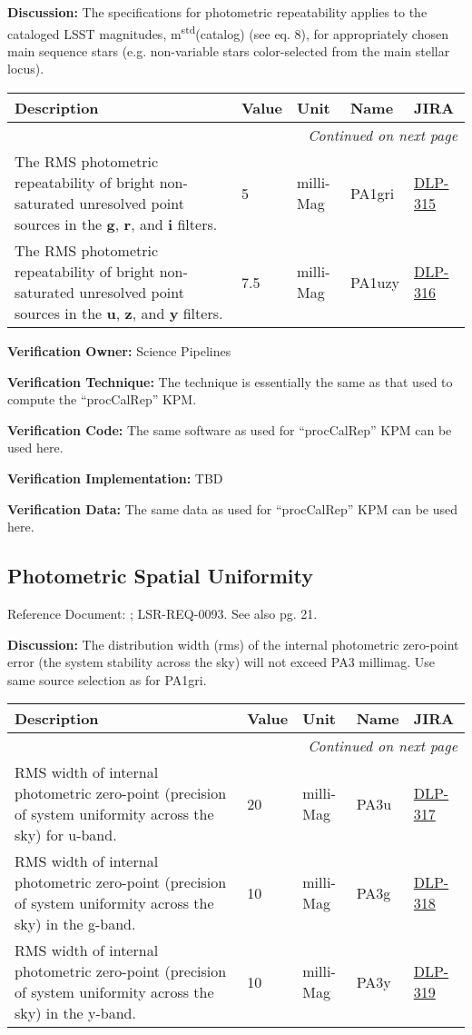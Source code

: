 \documentclass[DM,lsstdraft,toc]{lsstdoc}
\makeatletter
\newcommand{\jira}[1]{\href{https://jira.lsstcorp.org/browse/#1}{#1}}
\newenvironment{metric}[0]{%
\setlength\LTleft{0pt}
\setlength\LTright{\fill}
\begin{longtable}[]{@{}p{0.4\textwidth}lp{0.75in}p{1.3in}p{0.75in}@{}}

\hline \textbf{Description} & \textbf{Value} & \textbf{Unit} & \textbf{Name} & \textbf{JIRA} \\ \hline
\endhead

\hline \multicolumn{5}{r}{\emph{Continued on next page}} \\
\endfoot

\hline\hline
\endlastfoot
}{%
\hline
\end{longtable}
}
\makeatother
\begin{document}
\textbf{Discussion:} The specifications for photometric repeatability
applies to the cataloged LSST magnitudes,
m\textsuperscript{std}(catalog) (see \SRD eq. 8), for appropriately
chosen main sequence stars (e.g. non-variable stars color-selected from
the main stellar locus).

\begin{metric}
The RMS photometric repeatability of bright non-saturated unresolved
point sources in the \textbf{g}, \textbf{r}, and \textbf{i} filters. & 5
& milli-Mag & PA1gri & \jira{DLP-315}\tabularnewline
The RMS photometric repeatability of bright non-saturated unresolved
point sources in the \textbf{u}, \textbf{z}, and \textbf{y} filters. &
7.5 & milli-Mag & PA1uzy & \jira{DLP-316}\tabularnewline
\end{metric}

\textbf{Verification Owner:} Science Pipelines

\textbf{Verification Technique:} The technique is essentially the same
as that used to compute the ``procCalRep'' KPM.

\textbf{Verification Code:} The same software as used for ``procCalRep''
KPM can be used here.

\textbf{Verification Implementation:} TBD

\textbf{Verification Data:} The same data as used for ``procCalRep'' KPM
can be used here.

\subsection{Photometric Spatial
Uniformity}\label{photometric-spatial-uniformity}

Reference Document: ; LSR-REQ-0093. See also \SRD pg. 21.

\textbf{Discussion:} The distribution width (rms) of the internal
photometric zero-point error (the system stability across the sky) will
not exceed PA3 millimag. Use same source selection as for PA1gri.

\begin{metric}
RMS width of internal photometric zero-point (precision of system
uniformity across the sky) for u-band. & 20 & milli-Mag & PA3u &
\jira{DLP-317}\tabularnewline
RMS width of internal photometric zero-point (precision of system
uniformity across the sky) in the g-band. & 10 & milli-Mag & PA3g &
\jira{DLP-318}\tabularnewline
RMS width of internal photometric zero-point (precision of system
uniformity across the sky) in the y-band. & 10 & milli-Mag & PA3y &
\jira{DLP-319}\tabularnewline
\end{metric}
\end{document}
